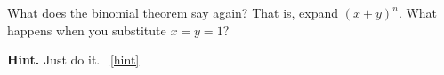 \documentclass{book}
\begin{document}
\setcounter{project}{79}
\addtocounter{project}{-1}
\begin{activity}[]\label{act-pascalrowsum-binom}
\hypertarget{p-603}{}%
What does the binomial theorem say again?  That is, expand \((x+y)^n\).  What happens when you substitute \(x = y = 1\)?%
\par\smallskip%
\noindent\textbf{Hint.}\hypertarget{hint-36}{}\quad%
\hypertarget{p-604}{}%
Just do it.%
~\hfill{\tiny\hyperlink{a-79}{[hint]}\hypertarget{q-79}{}}\end{activity}

\clearpage
\end{document}
